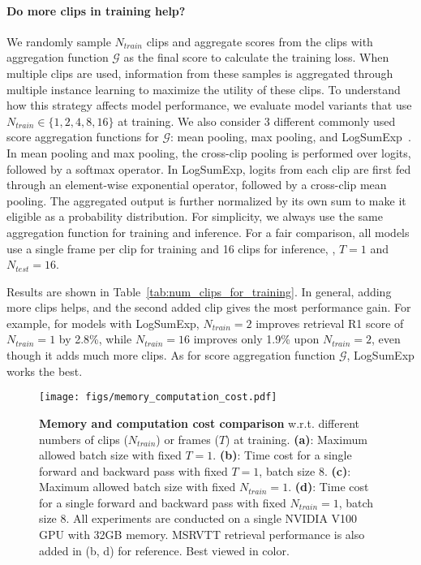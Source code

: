 \paragraph{Do more clips in training help?} 
We randomly sample $N_{train}$ clips and aggregate scores from the clips with aggregation function $\mathcal{G}$ as the final score to calculate the training loss.
When multiple clips are used, information from these samples is aggregated through multiple instance learning to maximize the utility of these clips. 
To understand how this strategy affects model performance, we evaluate model variants that use $N_{train} \in \{1, 2, 4, 8, 16\}$ at training.
We also consider 3 different commonly used score aggregation functions for $\mathcal{G}$: mean pooling, max pooling, and LogSumExp~\cite{miech2020end}. In mean pooling and max pooling, the cross-clip pooling is performed over logits, followed by a softmax operator. In LogSumExp, logits from each clip are first fed through an element-wise exponential operator, followed by a cross-clip mean pooling. The aggregated output is further normalized by its own sum to make it eligible as a probability distribution. For simplicity, we always use the same aggregation function for training and inference. 
For a fair comparison, all models use a single frame per clip for training and 16 clips for inference, \ie, $T{=}1$ and $N_{test}{=}16$.


Results are shown in Table~\ref{tab:num_clips_for_training}.
In general, adding more clips helps, and the second added clip gives the most performance gain. 
For example, for models with LogSumExp, $N_{train}{=}2$ improves retrieval R1 score of $N_{train}{=}1$ by 2.8\%, while $N_{train}{=}16$ improves only 1.9\% upon $N_{train}{=}2$, even though it adds much more clips.
As for score aggregation function $\mathcal{G}$, LogSumExp works the best. 



\begin{figure}[!t]
  \centering
  \texttt{[image: figs/memory\_computation\_cost.pdf]}
  \vspace{-3mm}
  \caption{
\textbf{Memory and computation cost comparison} w.r.t. different numbers of clips ($N_{train}$) or frames ($T$) at training. 
\textbf{(a)}: Maximum allowed batch size with fixed $T{=}1$. 
\textbf{(b)}: Time cost for a single forward and backward pass with fixed $T{=}1$, batch size 8. 
\textbf{(c)}: Maximum allowed batch size with fixed $N_{train}{=}1$. 
\textbf{(d)}: Time cost for a single forward and backward pass with fixed $N_{train}{=}1$, batch size 8.
All experiments are conducted on a single NVIDIA V100 GPU with 32GB memory. 
MSRVTT retrieval performance is also added in (b, d) for reference. Best viewed in color.
}
  \label{fig:memory_computation_cost}
  \vspace{-3mm}
\end{figure}



